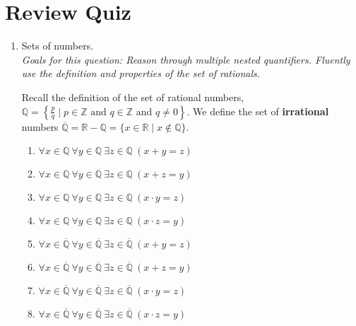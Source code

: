 \documentclass[12pt, oneside]{article}
\begin{document}
\section*{Review Quiz}
\begin{enumerate}
    \item Sets of numbers. \hspace{1in}\\ 

{\it  Goals for this question: Reason through
multiple nested quantifiers. Fluently use the definition and properties of the set of rationals. 
}

Recall the definition of the set of rational numbers, $\mathbb{Q} = \left\{ \frac{p}{q} \mid p \in \mathbb{Z}  \text{ and  } q  \in \mathbb{Z} \text{ and } q \neq  0 \right\}$.
We define the set of {\bf irrational} numbers $\overline{\mathbb{Q}} = \mathbb{R} - \mathbb{Q}
= \{ x \in \mathbb{R} \mid x \notin \mathbb{Q} \}$.
\begin{multicols}{2}
\begin{enumerate}[label=(\roman*)]
\item $\forall x \in \mathbb{Q} ~\forall y \in \mathbb{Q}~ \exists z \in \mathbb{Q} ~( x + y = z)$
\item $\forall x \in \mathbb{Q} ~\forall y \in \mathbb{Q}~ \exists z \in \mathbb{Q} ~( x + z = y)$
\item $\forall x \in \mathbb{Q} ~\forall y \in \mathbb{Q}~ \exists z \in \mathbb{Q} ~( x \cdot y = z)$
\item $\forall x \in \mathbb{Q} ~\forall y \in \mathbb{Q} ~\exists z \in \mathbb{Q} ~( x \cdot z = y)$
\item $\forall x \in \overline{\mathbb{Q}}~ \forall y \in \overline{\mathbb{Q}}~ \exists z \in \overline{\mathbb{Q}} ~( x + y = z)$
\item $\forall x \in \overline{\mathbb{Q}}~ \forall y \in \overline{\mathbb{Q}}~ \exists z \in \overline{\mathbb{Q}}~( x + z = y)$
\item $\forall x \in \overline{\mathbb{Q}} ~\forall y \in \overline{\mathbb{Q}}~ \exists z \in \overline{\mathbb{Q}} ~( x \cdot y = z)$
\item $\forall x \in \overline{\mathbb{Q}} ~\forall y \in \overline{\mathbb{Q}}~ \exists z \in \overline{\mathbb{Q}}~( x \cdot z = y)$
\end{enumerate}
\end{multicols}


\end{enumerate}
\end{document}
